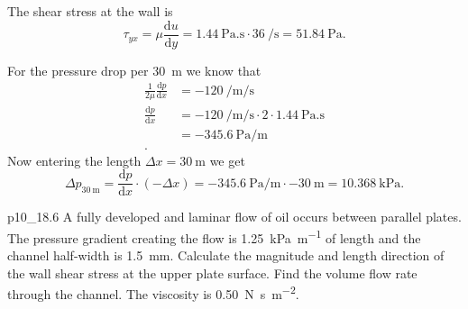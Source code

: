\begin{derivation}
  The shear stress at the wall is
  \[ 
  \tau_{yx} = \mu \frac{\mathrm{d}u}{\mathrm{d}y} = \qty{1,44}{\Pa.\s} \cdot \qty{36}{\per\s} = \qty{51,84}{\Pa} 
  .\]

  For the pressure drop per \qty{30}{\m} we know that
  \begin{align*}
    \frac{1}{2\mu} \frac{\mathrm{d}p}{\mathrm{d}x} &= \qty{-120}{\per\m\per\s}  \\
    \frac{\mathrm{d}p}{\mathrm{d}x} &= \qty{-120}{\per\m\per\s} \cdot 2 \cdot \qty{1,44}{\Pa.\s}  \\
    &= \qty{-345,6}{\Pa\per\m}  \\
  .\end{align*}
  Now entering the length $\Delta x = \qty{30}{\m} $ we get
  \[ 
  \Delta p_{\qty{30}{\m} } = \frac{\mathrm{d}p}{\mathrm{d}x} \cdot (-\Delta x) = \qty{-345,6}{\Pa\per\m} \cdot \qty{-30}{\m} = \qty{10,368}{\kPa} 
  .\]
\end{derivation}


\begin{problemwithimage}{p10_1}{8.6}
  A fully developed and laminar flow of oil occurs between parallel plates.
  The pressure gradient creating the flow is \qty{1,25}{\kPa\per\m} of length and the channel half-width is \qty{1,5}{\mm}.
  Calculate the magnitude and length direction of the wall shear stress at the upper plate surface.
  Find the volume flow rate through the channel.
  The viscosity is \qty{0,50}{\N.\s\per\square\m}. 
\end{problemwithimage}

